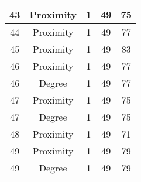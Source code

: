 \documentclass[results.tex]{subfiles}
\begin{document}
\begin{center}
\begin{tabular}{| c || c | c | c | c |}
    \hline
    43 & Proximity & 1 & 49 & 75 \\ 
    \hline
    44 & Proximity & 1 & 49 & 77 \\ 
    \hline
    45 & Proximity & 1 & 49 & 83 \\ 
    \hline
    46 & Proximity & 1 & 49 & 77 \\ 
    \hline
    46 & Degree & 1 & 49 & 77 \\ 
    \hline
    47 & Proximity & 1 & 49 & 75 \\ 
    \hline
    47 & Degree & 1 & 49 & 75 \\ 
    \hline
    48 & Proximity & 1 & 49 & 71 \\ 
    \hline
    49 & Proximity & 1 & 49 & 79 \\ 
    \hline
    49 & Degree & 1 & 49 & 79 \\ 
    \hline   \end{tabular}
\end{center}
\end{document}
